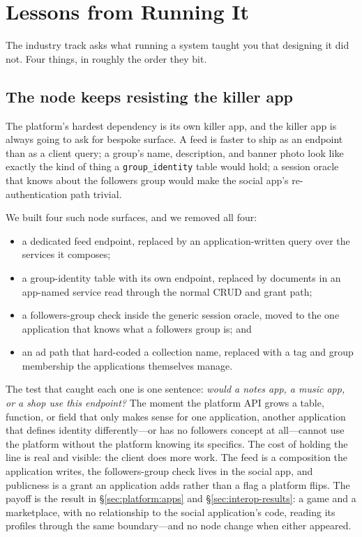 \documentclass[sigconf, nonacm]{acmart}
\begin{document}
\section{Lessons from Running It}
\label{sec:lessons}

The industry track asks what running a system taught you that designing it
did not. Four things, in roughly the order they bit.

\subsection{The node keeps resisting the killer app}

The platform's hardest dependency is its own killer app, and the killer app
is always going to ask for bespoke surface. A feed is faster to ship as an
endpoint than as a client query; a group's name, description, and banner
photo look like exactly the kind of thing a \texttt{group\_identity} table
would hold; a session oracle that knows about the followers group would make
the social app's re-authentication path trivial.

We built four such node surfaces, and we removed all four:

\begin{itemize}[leftmargin=*,nosep]
  \item a dedicated feed endpoint, replaced by an application-written query
  over the services it composes;
  \item a group-identity table with its own endpoint, replaced by documents
  in an app-named service read through the normal CRUD and grant path;
  \item a followers-group check inside the generic session oracle, moved to
  the one application that knows what a followers group is; and
  \item an ad path that hard-coded a collection name, replaced with a tag and
  group membership the applications themselves manage.
\end{itemize}

The test that caught each one is one sentence: \emph{would a notes app, a
music app, or a shop use this endpoint?} The moment the platform API grows a
table, function, or field that only makes sense for one application, another
application that defines identity differently---or has no followers
concept at all---cannot use the platform without the platform knowing its
specifics. The cost of holding the line is real and visible: the client does
more work. The feed is a composition the application writes, the
followers-group check lives in the social app, and publicness is a grant an
application adds rather than a flag a platform flips. The payoff is the
result in \S\ref{sec:platform:apps} and \S\ref{sec:interop-results}: a game
and a marketplace, with no relationship to the social application's code,
reading its profiles through the same boundary---and no node change when
either appeared.
\end{document}

